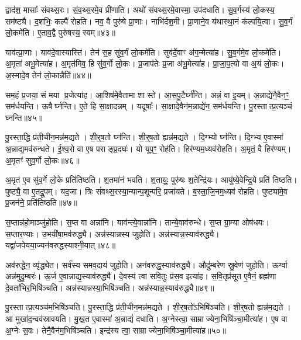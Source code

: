 द्वाद॑श॒ मासाः᳚ संवथ्स॒रः।
सं॒व॒थ्स॒रमे॒व प्री॑णाति।
अथो॑ संवथ्स॒रमे॒वास्मा॒ उप॑दधाति।
सु॒व॒र्गस्य॑ लो॒कस्य॒ सम॑ष्ट्यै।
द॒शभिः॒ कल्पै॑ रोहति।
नव॒ वै पुरु॑षे प्रा॒णाः।
नाभि॑र्दश॒मी।
प्रा॒णाने॒व य॑थास्था॒नं क॑ल्पयि॒त्वा।
सु॒व॒र्गं लो॒कमे॑ति।
ए॒ताव॒द्वै पुरु॑षस्य॒ स्वम्॥४३॥

याव॑त्प्रा॒णाः।
याव॑दे॒वास्यास्ति॑।
तेन॑ स॒ह सु॑व॒र्गं लो॒कमे॑ति।
सुव॑र्दे॒वाꣳ अ॑ग॒न्मेत्या॑ह।
सु॒व॒र्गमे॒व लो॒कमे॑ति।
अ॒मृता॑ अभू॒मेत्या॑ह।
अ॒मृत॑मिव॒ हि सु॑व॒र्गो लो॒कः।
प्र॒जाप॑तेः प्र॒जा अ॑भू॒मेत्या॑ह।
प्रा॒जा॒प॒त्यो वा अ॒यं लो॒कः।
अ॒स्मादे॒व तेन॑ लो॒कान्नैति॑॥४४॥

सम॒हं प्र॒जया॒ सं मया प्र॒जेत्या॑ह।
आ॒शिष॑मे॒वैतामा शास्ते।
आ॒स॒पु॒टैर्घ्न॑न्ति।
अन्नं॒ वा इ॒यम्।
अ॒न्नाद्ये॑नै॒वैन॒ꣳ॒ सम॑र्धयन्ति।
ऊषैर्घ्नन्ति।
ए॒ते हि सा॒क्षादन्नम्।
यदूषाः᳚।
सा॒क्षादे॒वैन॑म॒न्नाद्ये॑न॒ सम॑र्धयन्ति।
पु॒रस्तात्प्र॒त्यञ्चं घ्नन्ति॥४५॥

पु॒रस्ता॒द्धि प्र॑ती॒चीन॒मन्न॑म॒द्यते।
शी॒र्॒ष॒तो घ्न॑न्ति।
शी॒र्॒ष॒तो ह्यन्न॑म॒द्यते।
दि॒ग्भ्यो घ्न॑न्ति।
दि॒ग्भ्य ए॒वास्मा॑ अ॒न्नाद्य॒मव॑रुन्धते।
ई॒श्व॒रो वा ए॒ष पराङ्प्र॒दघः॑।
यो यूप॒ꣳ॒ रोह॑ति।
हिर॑ण्यम॒ध्यव॑रोहति।
अ॒मृतं॒ वै हिर॑ण्यम्।
अ॒मृतꣳ॑ सुव॒र्गो लो॒कः॥४६॥

अ॒मृत॑ ए॒व सु॑व॒र्गे लो॒के प्रति॑तिष्ठति।
श॒तमा॑नं भवति।
श॒तायुः॒ पुरु॑षः श॒तेन्द्रि॑यः।
आयु॑ष्ये॒वेन्द्रि॒ये प्रति॑ तिष्ठति।
पुष्ट्यै॒ वा ए॒तद्रू॒पम्।
यद॒जा।
त्रिः सं॑वथ्स॒रस्या॒न्यान्प॒शून्परि॒ प्रजा॑यते।
ब॒स्ता॒जि॒नम॒ध्यव॑ रोहति।
पुष्ट्या॑मे॒व प्र॒जन॑ने॒ प्रति॑तिष्ठति॥४७॥\anuvakamend[प॒रि॒धा॒पय॑ति गो॒धूमा॑ जुहोति॒ स्वं नैति॑ प्र॒त्यञ्चं घ्नन्ति लो॒को नव॑ च]

स॒प्तान्न॑हो॒माञ्जु॑होति।
स॒प्त वा अन्ना॑नि।
याव॑न्त्ये॒वान्ना॑नि।
तान्ये॒वाव॑रुन्धे।
स॒प्त ग्रा॒म्या ओष॑धयः।
स॒प्तार॒ण्याः।
उ॒भयी॑षा॒मव॑रुद्ध्यै।
अन्न॑स्यान्नस्य जुहोति।
अन्न॑स्यान्न॒स्या\-व॑रुद्ध्यै।
यद्वा॑जपेयया॒ज्यन॑वरुद्धस्याश्नी॒यात्॥४८॥

अव॑रुद्धेन॒ व्यृ॑द्ध्येत।
सर्व॑स्य समव॒दाय॑ जुहोति।
अन॑वरुद्ध॒स्याव॑रुद्ध्यै।
औदु॑म्बरेण स्रु॒वेण॑ जुहोति।
ऊर्ग्वा अन्न॑मुदु॒म्बरः॑।
ऊ॒र्ज ए॒वान्नाद्य॒स्याव॑रुद्ध्यै।
दे॒वस्य॑ त्वा सवि॒तुः प्र॑स॒व इत्या॑ह।
स॒वि॒तृप्र॑सूत ए॒वैनं॒ ब्रह्म॑णा दे॒वता॑भिर॒भिषि॑ञ्चति।
अन्न॑स्यान्नस्या॒भिषि॑ञ्चति।
अन्न॑स्यान्न॒स्याव॑रुद्ध्यै॥४९॥

पु॒रस्तात्प्र॒त्यञ्च॑म॒भिषि॑ञ्चति।
पु॒रस्ता॒द्धि प्र॑ती॒चीन॒मन्न॑म॒द्यते।
शी॒र्॒ष॒तो॑\-ऽभिषि॑ञ्चति।
शी॒र्॒ष॒तो ह्यन्न॑म॒द्यते।
आ मुखा॑द॒न्वव॑\-स्रावयति।
मु॒ख॒त ए॒वास्मा॑ अ॒न्नाद्यं॑ दधाति।
अ॒ग्नेस्त्वा॒ साम्राज्येना॒\-भिषि॑ञ्चा॒मी\-त्या॑ह।
ए॒ष वा अ॒ग्नेः स॒वः।
तेनै॒वैन॑म॒भि\-षि॑ञ्चति।
इन्द्र॑स्य त्वा॒ साम्राज्येना॒\-भिषि॑ञ्चा॒मी\-त्या॑ह॥५०॥

